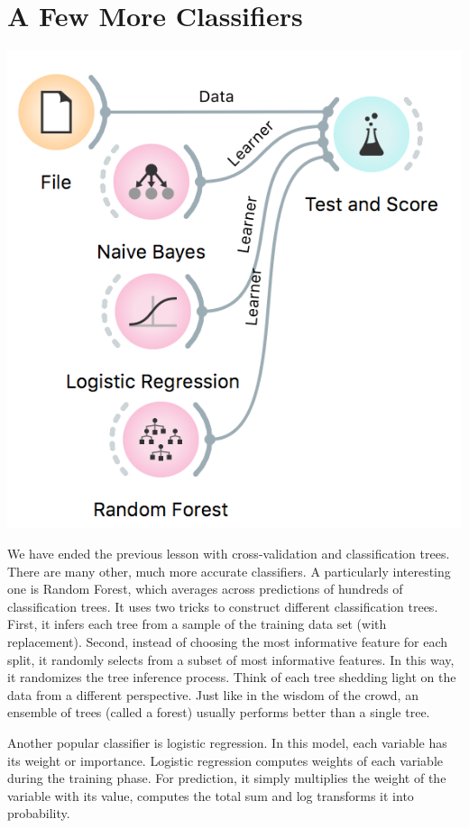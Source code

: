 \chapter{A Few More Classifiers}
\label{ch:more-classifiers}

\begin{marginfigure}[2.0cm]
    \includegraphics[width=\linewidth]{workflow1.png}
\end{marginfigure}

We have ended the previous lesson with cross-validation and classification trees. There are many other, much more accurate classifiers. A particularly interesting one is Random Forest, which averages across predictions of hundreds of classification trees. It uses two tricks to construct different classification trees. First, it infers each tree from a sample of the training data set (with replacement). Second, instead of choosing the most informative feature for each split, it randomly selects from a subset of most informative features. In this way, it randomizes the tree inference process. Think of each tree shedding light on the data from a different perspective. Just like in the wisdom of the crowd, an ensemble of trees (called a forest) usually performs better than a single tree.

Another popular classifier is logistic regression. In this model, each variable has its weight or importance. Logistic regression computes weights of each variable during the training phase. For prediction, it simply multiplies the weight of the variable with its value, computes the total sum and log transforms it into probability.

